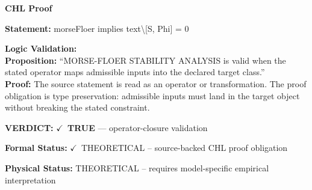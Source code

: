 \vspace{0.45em}
\noindent\textbf{CHL Proof}\par
\textbf{Statement:} morseFloer implies text\textbackslash{}[S, Phi] = 0

\textbf{Logic Validation:}\\
\textbf{Proposition:} ``MORSE-FLOER STABILITY ANALYSIS is valid when the stated operator maps admissible inputs
into the declared target class.''\\
\textbf{Proof:} The source statement is read as an operator or transformation. The proof obligation is
type preservation: admissible inputs must land in the target object without breaking the
stated constraint.

\textbf{VERDICT:} \ensuremath{\checkmark}\ \textbf{TRUE} --- operator-closure validation

\textbf{Formal Status:} \ensuremath{\checkmark}\ THEORETICAL -- source-backed CHL proof obligation

\textbf{Physical Status:} THEORETICAL -- requires model-specific empirical interpretation
\par\vspace{0.45em}
\par
\ifTZPDarkEdition
{}
\fi
\endgroup
\endgroup
